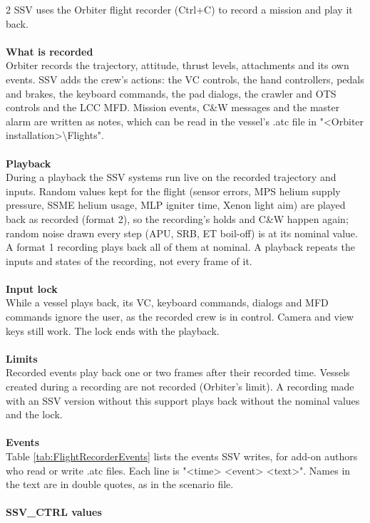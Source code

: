 \documentclass[Space_Shuttle_Vessel_Manual.tex]{subfiles}
\begin{document}
\begin{multicols*}{2}
\noindent
SSV uses the Orbiter flight recorder (Ctrl+C) to record a mission and play it back.\\
\\
\textbf{What is recorded}\\
Orbiter records the trajectory, attitude, thrust levels, attachments and its own events. SSV adds the crew's actions: the VC controls, the hand controllers, pedals and brakes, the keyboard commands, the pad dialogs, the crawler and OTS controls and the LCC MFD. Mission events, C\&W messages and the master alarm are written as notes, which can be read in the vessel's .atc file in "<Orbiter installation>\textbackslash Flights".\\
\\
\textbf{Playback}\\
During a playback the SSV systems run live on the recorded trajectory and inputs. Random values kept for the flight (sensor errors, MPS helium supply pressure, SSME helium usage, MLP igniter time, Xenon light aim) are played back as recorded (format 2), so the recording's holds and C\&W happen again; random noise drawn every step (APU, SRB, ET boil-off) is at its nominal value. A format 1 recording plays back all of them at nominal. A playback repeats the inputs and states of the recording, not every frame of it.\\
\\
\textbf{Input lock}\\
While a vessel plays back, its VC, keyboard commands, dialogs and MFD commands ignore the user, as the recorded crew is in control. Camera and view keys still work. The lock ends with the playback.\\
\\
\textbf{Limits}\\
Recorded events play back one or two frames after their recorded time. Vessels created during a recording are not recorded (Orbiter's limit). A recording made with an SSV version without this support plays back without the nominal values and the lock.\\
\\
\textbf{Events}\\
Table \ref{tab:FlightRecorderEvents} lists the events SSV writes, for add-on authors who read or write .atc files. Each line is "<time> <event> <text>". Names in the text are in double quotes, as in the scenario file.\\
\\
\textbf{SSV\_CTRL values}\\

\end{multicols*}
\end{document}
